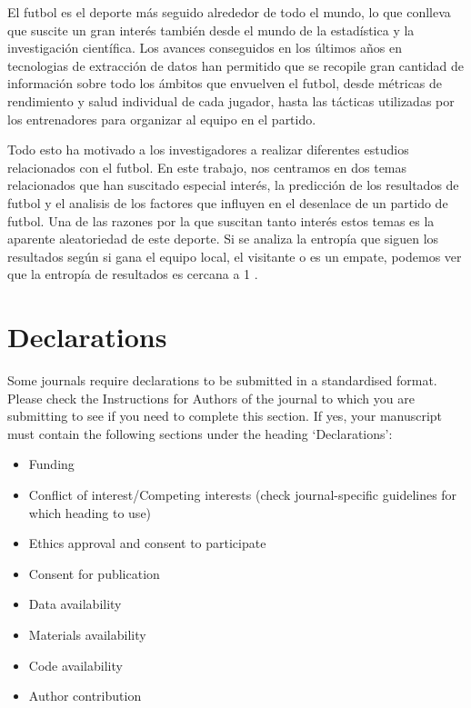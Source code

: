 \documentclass[sn-mathphys-num]{sn-jnl}%
\theoremstyle{thmstyleone}%
\theoremstyle{thmstyletwo}%
\theoremstyle{thmstylethree}%
\begin{document}
El futbol es el deporte más seguido alrededor de todo el mundo, lo que conlleva que %
suscite un gran interés también desde el mundo de la estadística y la investigación científica. Los avances conseguidos en los últimos años en tecnologias de extracción de datos han permitido que se recopile gran cantidad de información sobre todo los ámbitos que envuelven el futbol, desde métricas de rendimiento y salud individual de cada jugador, hasta las tácticas utilizadas por los entrenadores para organizar al equipo en el partido.

Todo esto ha motivado a los investigadores a realizar diferentes estudios relacionados con el futbol. En este trabajo, nos centramos en dos temas relacionados que han suscitado especial interés, la predicción de los resultados de futbol y el analisis de los factores que influyen en el desenlace de un partido de futbol. Una de las razones por la que suscitan tanto interés estos temas es la aparente aleatoriedad de este deporte. Si se analiza la entropía que siguen los resultados según si gana el equipo local, el visitante o es un empate, podemos ver que la entropía de resultados es cercana a 1 \cite{Ulmer2014PredictingSM}.



\section*{Declarations}

Some journals require declarations to be submitted in a standardised format. Please check the Instructions for Authors of the journal to which you are submitting to see if you need to complete this section. If yes, your manuscript must contain the following sections under the heading `Declarations':

\begin{itemize}
\item Funding
\item Conflict of interest/Competing interests (check journal-specific guidelines for which heading to use)
\item Ethics approval and consent to participate
\item Consent for publication
\item Data availability 
\item Materials availability
\item Code availability 
\item Author contribution
\end{itemize}
\end{document}
